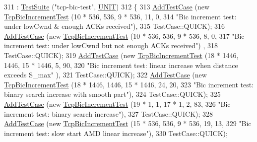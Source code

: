 \begin{DoxyCode}
311                      : \hyperlink{classns3_1_1TestSuite_a904b0c40583b744d30908aeb94636d1a}{TestSuite} (\textcolor{stringliteral}{"tcp-bic-test"}, \hyperlink{classns3_1_1TestSuite_a1ebfcab34ec8161e085e8e3a1855eae0a3885375a3787abf60431f8454b3cadbd}{UNIT})
312   \{
313     \hyperlink{classns3_1_1TestCase_a3718088e3eefd5d6454569d2e0ddd835}{AddTestCase} (\textcolor{keyword}{new} \hyperlink{classTcpBicIncrementTest}{TcpBicIncrementTest} (10 * 536, 536, 9 * 536, 11, 0,
314                                           \textcolor{stringliteral}{"Bic increment test: under lowCwnd & enough ACKs received"}),
315                  TestCase::QUICK);
316     \hyperlink{classns3_1_1TestCase_a3718088e3eefd5d6454569d2e0ddd835}{AddTestCase} (\textcolor{keyword}{new} \hyperlink{classTcpBicIncrementTest}{TcpBicIncrementTest} (10 * 536, 536, 9 * 536, 8, 0,
317                                           \textcolor{stringliteral}{"Bic increment test: under lowCwnd but not enough ACKs received"})
      ,
318                  TestCase::QUICK);
319     \hyperlink{classns3_1_1TestCase_a3718088e3eefd5d6454569d2e0ddd835}{AddTestCase} (\textcolor{keyword}{new} \hyperlink{classTcpBicIncrementTest}{TcpBicIncrementTest} (18 * 1446, 1446, 15 * 1446, 5, 90,
320                                           \textcolor{stringliteral}{"Bic increment test: linear increase when distance exceeds S\_max"}
      ),
321                  TestCase::QUICK);
322     \hyperlink{classns3_1_1TestCase_a3718088e3eefd5d6454569d2e0ddd835}{AddTestCase} (\textcolor{keyword}{new} \hyperlink{classTcpBicIncrementTest}{TcpBicIncrementTest} (18 * 1446, 1446, 15 * 1446, 24, 20,
323                                           \textcolor{stringliteral}{"Bic increment test: binary search increase with smooth part"}),
324                  TestCase::QUICK);
325     \hyperlink{classns3_1_1TestCase_a3718088e3eefd5d6454569d2e0ddd835}{AddTestCase} (\textcolor{keyword}{new} \hyperlink{classTcpBicIncrementTest}{TcpBicIncrementTest} (19 * 1, 1, 17 * 1, 2, 83,
326                                           \textcolor{stringliteral}{"Bic increment test: binary search increase"}),
327                  TestCase::QUICK);
328     \hyperlink{classns3_1_1TestCase_a3718088e3eefd5d6454569d2e0ddd835}{AddTestCase} (\textcolor{keyword}{new} \hyperlink{classTcpBicIncrementTest}{TcpBicIncrementTest} (15 * 536, 536, 9 * 536, 19, 13,
329                                           \textcolor{stringliteral}{"Bic increment test: slow start AMD linear increase"}),
330                  TestCase::QUICK);

\end{DoxyCode}
